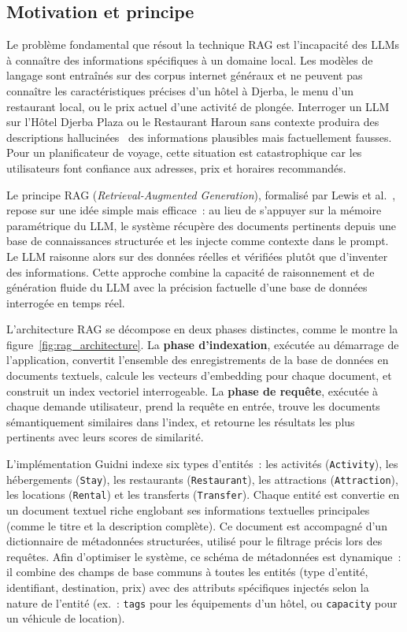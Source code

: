 \subsection{Motivation et principe}

Le problème fondamental que résout la technique RAG est l'incapacité des LLMs à connaître des
informations spécifiques à un domaine local. Les modèles de langage sont entraînés sur des corpus
internet généraux et ne peuvent pas connaître les caractéristiques précises d'un hôtel à Djerba,
le menu d'un restaurant local, ou le prix actuel d'une activité de plongée. Interroger un LLM sur
\og{}l'Hôtel Djerba Plaza\fg{} ou \og{}le Restaurant Haroun\fg{} sans contexte produira des
descriptions hallucinées~  des informations plausibles mais factuellement fausses. Pour un
planificateur de voyage, cette situation est catastrophique car les utilisateurs font confiance
aux adresses, prix et horaires recommandés.

Le principe RAG (\textit{Retrieval-Augmented Generation}), formalisé par Lewis et al.~\cite{lewis2020rag},
repose sur une idée simple mais efficace~: au lieu de s'appuyer sur la mémoire paramétrique du LLM,
le système récupère des documents pertinents depuis une base de connaissances structurée et les
injecte comme contexte dans le prompt. Le LLM raisonne alors sur des données réelles et vérifiées
plutôt que d'inventer des informations. Cette approche combine la capacité de raisonnement et de
génération fluide du LLM avec la précision factuelle d'une base de données interrogée en temps réel.

L'architecture RAG se décompose en deux phases distinctes, comme le montre la figure~\ref{fig:rag_architecture}. La \textbf{phase d'indexation}, exécutée
au démarrage de l'application, convertit l'ensemble des enregistrements de la base de données en
documents textuels, calcule les vecteurs d'embedding pour chaque document, et construit un index
vectoriel interrogeable. La \textbf{phase de requête}, exécutée à chaque demande utilisateur,
prend la requête en entrée, trouve les documents sémantiquement similaires dans l'index, et
retourne les résultats les plus pertinents avec leurs scores de similarité.

L'implémentation Guidni indexe six types d'entités~: les activités (\texttt{Activity}), les
hébergements (\texttt{Stay}), les restaurants (\texttt{Restaurant}), les attractions
(\texttt{Attraction}), les locations (\texttt{Rental}) et les transferts (\texttt{Transfer}).
Chaque entité est convertie en un document textuel riche englobant ses informations textuelles 
principales (comme le titre et la description complète). Ce document est accompagné d'un 
dictionnaire de métadonnées structurées, utilisé pour le filtrage précis lors des requêtes. 
Afin d'optimiser le système, ce schéma de métadonnées est dynamique~: il combine des champs 
de base communs à toutes les entités (type d'entité, identifiant, destination, prix) avec 
des attributs spécifiques injectés selon la nature de l'entité (ex.~: \texttt{tags} pour les 
équipements d'un hôtel, ou \texttt{capacity} pour un véhicule de location).


